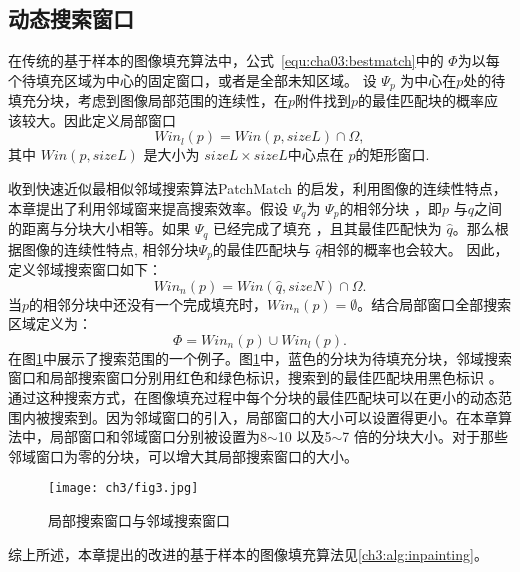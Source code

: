  \subsection{动态搜索窗口}
 \label{sec:sub:dynamicSearch}
 在传统的基于样本的图像填充算法中，公式~\ref{equ:cha03:bestmatch}中的 \(\Phi\)为以每个待填充区域为中心的固定窗口\cite{LeMeur_2011}，或者是全部未知区域。 设 \(\Psi_p\) 为中心在\(p\)处的待填充分块，考虑到图像局部范围的连续性，在\(p\)附件找到\(p\)的最佳匹配块的概率应该较大。因此定义局部窗口
 $$Win_l(p)=Win(p,sizeL)\cap \Omega,$$
 其中 \(Win(p,sizeL)\) 是大小为 \(sizeL\times sizeL\)中心点在 \( p\)的矩形窗口. \par
 收到快速近似最相似邻域搜索算法PatchMatch \cite{Barnes:2009}的启发，利用图像的连续性特点，本章提出了利用邻域窗来提高搜索效率。假设 \(\Psi_q\)为 \(\Psi_p\)的相邻分块 ，即\(p\) 与\(q\)之间的距离与分块大小相等。如果 \(\Psi_q\) 已经完成了填充 ，且其最佳匹配快为 \(\hat{q}\)。那么根据图像的连续性特点,  相邻分块\(\Psi_p\)的最佳匹配块与 \(\hat{q}\)相邻的概率也会较大。 因此，定义邻域搜索窗口如下：
 $$Win_n(p)=Win(\hat{q},sizeN)\cap\Omega.$$ 
 当\(p\)的相邻分块中还没有一个完成填充时，\( Win_n(p)=\emptyset  \)。结合局部窗口全部搜索区域定义为：
 $$\Phi=Win_n(p)\cup Win_l(p).$$
 在图\ref{ch3:fig:3}中展示了搜索范围的一个例子。图\ref{ch3:fig:3}中，蓝色的分块为待填充分块，邻域搜索窗口和局部搜索窗口分别用红色和绿色标识，搜索到的最佳匹配块用黑色标识 。通过这种搜索方式，在图像填充过程中每个分块的最佳匹配块可以在更小的动态范围内被搜索到。因为邻域窗口的引入，局部窗口的大小可以设置得更小。在本章算法中，局部窗口和邻域窗口分别被设置为8\(\sim\)10 以及5\(\sim\)7 倍的分块大小。对于那些邻域窗口为零的分块，可以增大其局部搜索窗口的大小。\par
 \begin{figure}[!htbp]
 	\begin{center}
 			\texttt{[image: ch3/fig3.jpg]}
 	\end{center}
     \caption{局部搜索窗口与邻域搜索窗口}
 	\label{ch3:fig:3}
 \end{figure}
 综上所述，本章提出的改进的基于样本的图像填充算法见\ref{ch3:alg:inpainting}。
 \renewcommand{\algorithmcfname}{算法}

